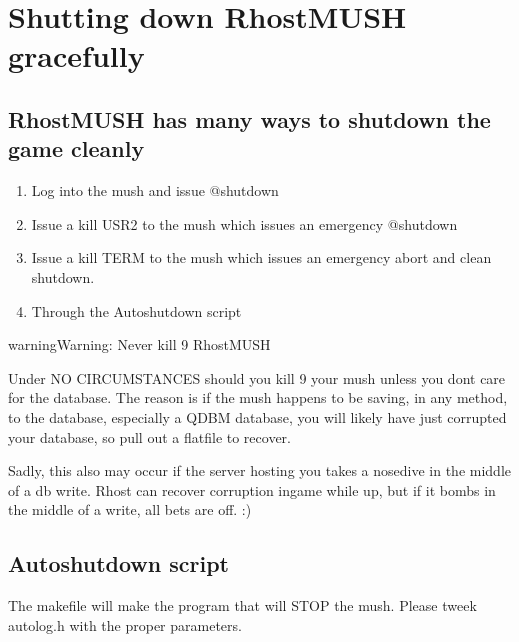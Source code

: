 \documentclass[letterpaper,10pt,english]{sphinxmanual}
\begin{document}
\section{Shutting down RhostMUSH gracefully}
\label{\detokenize{maintenance:shutting-down-rhostmush-gracefully}}

\subsection{RhostMUSH has many ways to shutdown the game cleanly}
\label{\detokenize{maintenance:rhostmush-has-many-ways-to-shutdown-the-game-cleanly}}\begin{enumerate}
%
\item {} 
\sphinxAtStartPar
Log into the mush and issue @shutdown

\item {} 
\sphinxAtStartPar
Issue a kill \sphinxhyphen{}USR2 to the mush which issues an emergency @shutdown

\item {} 
\sphinxAtStartPar
Issue a kill \sphinxhyphen{}TERM to the mush which issues an emergency abort and clean shutdown.

\item {} 
\sphinxAtStartPar
Through the Autoshutdown script

\end{enumerate}

\begin{sphinxadmonition}{warning}{Warning:}
\sphinxAtStartPar
Never kill \sphinxhyphen{}9 RhostMUSH

\sphinxAtStartPar
Under NO CIRCUMSTANCES should you kill \sphinxhyphen{}9 your mush unless you don\textquotesingle{}t care for the
database.  The reason is if the mush happens to be saving, in any method, to the
database, especially a QDBM database, you will likely have just corrupted your
database, so pull out a flatfile to recover.

\sphinxAtStartPar
Sadly, this also may occur if the server hosting you takes a nose\sphinxhyphen{}dive in the middle
of a db write.  Rhost can recover corruption in\sphinxhyphen{}game while up, but if it bombs
in the middle of a write, all bets are off. :)
\end{sphinxadmonition}


\subsection{Autoshutdown script}
\label{\detokenize{maintenance:autoshutdown-script}}
\sphinxAtStartPar
The makefile will \textquotesingle{}make\textquotesingle{} the program that will STOP the mush.
Please tweek \textquotesingle{}autolog.h\textquotesingle{} with the proper parameters.
\end{document}
